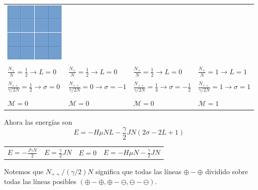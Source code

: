 \documentclass[10pt,oneside]{CBFT_book}
\begin{document}
\begin{center}
\begin{tabular}{l|l|l|l}
\includegraphics[scale=0.3]{images/fig_ajedrez4.pdf} \\
 & & & \\
$ \displaystyle \frac{N_+}{N} =\frac{1}{2} \to L=0 $ & $ \displaystyle \frac{N_+}{N} =\frac{1}{2} \to L=0 $ & 
$ \displaystyle \frac{N_+}{N} =\frac{1}{2} \to L=0 $ & $ \displaystyle \frac{N_+}{N} =1 \to L=1 $ \\
 & & & \\
$ \displaystyle \frac{N_{++}}{\gamma/2 N} =\frac{1}{2} \to \sigma=0 $ & 
$ \displaystyle \frac{N_{++}}{\gamma/2 N} = 0 \to \sigma=-1 $ & 
$ \displaystyle \frac{N_{++}}{\gamma/2 N} =\frac{1}{4} \to \sigma=-\frac{1}{2} $ & 
$\displaystyle \frac{N_{++}}{\gamma/2 N} = 1 \to \sigma=1$ \\
 & & & \\
$\mathcal{M}=0$ & $\mathcal{M}=0$ & $\mathcal{M}=0$ & $\mathcal{M}=1$
\end{tabular}
\end{center}

Ahora las energías son
\[
	E = - H \mu N L - \frac{\gamma}{2} J N ( 2\sigma - 2L + 1 )
\]
\begin{center}
\begin{tabular}{l|l|l|l}
 $E=-\frac{J\gamma N}{2}$ & $E =\frac{\gamma}{2} J N$ & $E=0$ & $E = - H \mu N - \frac{\gamma}{2} J N$\\
\end{tabular}
\end{center}

Notemos que $N_{++}/(\gamma/2)N$ significa que todas las líneas $\oplus - \oplus$ dividido sobre todas
las líneas posibles $(\oplus - \oplus, \oplus - \ominus, \ominus - \ominus)$.
\end{document}
